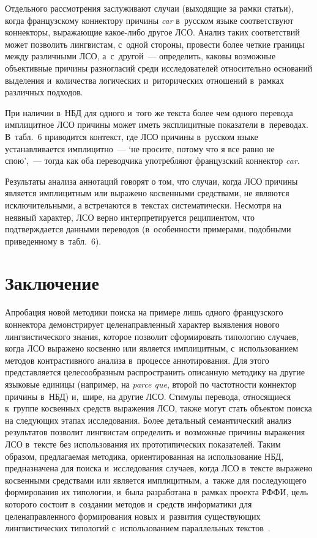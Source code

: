 \begin{multicols}{2}
   Отдельного рассмотрения заслуживают случаи (выходящие за рамки 
статьи), когда французскому коннектору причины \textit{car} в~русском языке 
соответствуют коннекторы, выражающие какое-либо другое ЛСО. Анализ 
таких соответствий может позволить лингвистам, с~одной стороны, провести 
более четкие границы между различными ЛСО, а~с~другой~--- определить, 
каковы возможные объективные причины разногласий среди исследователей 
относительно оснований выделения и~количества логических и~риторических 
отношений в~рамках различных подходов.
   
   При наличии в~НБД для одного и~того же текста более чем одного 
перевода имплицитное ЛСО причины может иметь эксплицитные показатели 
в~переводах. В~табл.~6 приводится контекст, где ЛСО причины в~русском 
языке устанавливается имплицитно~--- `не просите, потому что я все равно 
не спою',~--- тогда как оба переводчика употребляют французский коннектор 
\textit{car}.
   

   
   Результаты анализа аннотаций говорят о том, что случаи, когда ЛСО 
причины является имплицитным или выражено косвенными средствами, не 
являются исключительными, а встречаются в~текстах систематически. 
Несмотря на неявный характер, ЛСО верно интерпретируется реципиентом, 
что подтверждается данными переводов (в~особенности примерами, 
подобными приведенному в~табл.~6).

\vspace*{-11pt}
   
\section{Заключение}

\vspace*{-2pt}

   Апробация новой методики поиска на примере лишь одного французского 
коннектора демонстрирует целенаправленный характер выявления нового 
лингвистического знания, которое позволит сформировать типологию 
случаев, когда ЛСО выражено косвенно или является имплицитным, 
с~использованием методов контрастивного анализа в~процессе 
аннотирования. Для этого представляется целесообразным распространить 
описанную методику на другие языковые единицы (например, на \textit{parce 
que}, второй по частотности коннектор причины в~НБД) и,~шире, на другие 
ЛСО. Стимулы перевода, относящиеся к~группе косвенных средств выражения ЛСО, также 
могут стать объектом поиска на следующих этапах исследования. Более 
детальный семантический анализ результатов позволит лингвистам 
определить и~возможные причины выражения ЛСО в~тексте без 
использования их прототипических показателей. Таким образом, 
предлагаемая методика, ориентированная на использование НБД, 
предназначена для поиска и~исследования случаев, когда ЛСО в~тексте 
выражено косвенными средствами или является имплицитным, а~также для 
последующего формирования их типологии, и~была разработана в~рамках 
проекта РФФИ, цель которого состоит в~создании методов и~средств 
информатики для целенаправленного формирования новых и~развития 
существующих лингвистических типологий с~использованием параллельных 
текстов~\cite{17-in, 18-in, 19-in, 20-in}.


\end{multicols}
